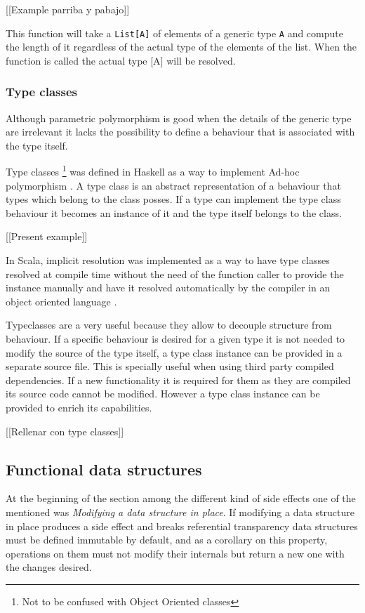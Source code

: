 \documentclass[../main.tex]{subfiles}
\begin{document}
[[Example parriba y pabajo]]

This function will take a \texttt{List[A]} of elements of a generic type
\texttt{A} and compute the length of it regardless of the actual type of the
elements of the list. When the function is called the actual type [A] will be
resolved.

\subsubsection{Type classes} Although parametric polymorphism is good when the
details of the generic type are irrelevant it lacks the possibility to define a
behaviour that is associated with the type itself.

Type classes \footnote{Not to be confused with Object Oriented classes} was
defined in Haskell as a way to implement Ad-hoc polymorphism
\autocite{Hall1994TypeHaskell}. A type class is an abstract representation of a
behaviour that types which belong to the class posses. If a type can implement
the type class behaviour it becomes an instance of it and the type itself
belongs to the class.

[[Present example]]

In Scala, implicit resolution was implemented as a way to have type classes
resolved at compile time without the need of the function caller to provide the
instance manually and have it resolved automatically by the compiler in an
object oriented language \autocite{Oliveira2010TypeImplicits}.

Typeclasses are a very useful because they allow to decouple structure from
behaviour. If a specific behaviour is desired for a given type it is not needed
to modify the source of the type itself, a type class instance can be provided
in a separate source file. This is specially useful when using third party
compiled dependencies. If a new functionality it is required for them as they
are compiled its source code cannot be modified. However a type class instance
can be provided to enrich its capabilities.

[[Rellenar con type classes]]

\subsection{Functional data structures} At the beginning of the section among
the different kind of side effects one of the mentioned was \textit{Modifying a
data structure in place}. If modifying a data structure in place produces a side
effect and breaks referential transparency data structures must be defined
immutable by default, and as a corollary on this property, operations on them
must not modify their internals but return a new one with the changes desired.
\end{document}
